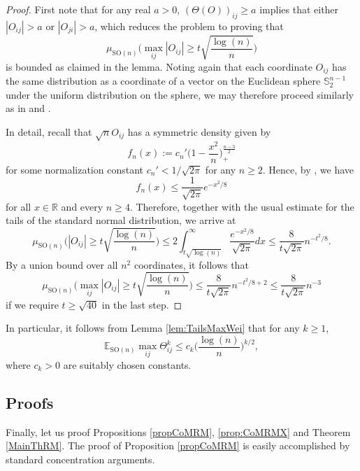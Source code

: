 \documentclass[a4paper,12pt]{amsart}
\numberwithin{equation}{section}
\theoremstyle{remark}
\def\E{{\mathbb E}}
\def\R{{\mathbb R}}
\def\S{{\mathbb S}}
\begin{document}
\begin{proof}
First note that for any real $a> 0$, $(\Theta(O))_{ij} \ge a$ implies that either $|O_{ij}| > a$ or $|O_{ji}| > a$, which reduces the problem to proving that
\[
\mu_{\mathrm{SO}(n)}\Big(\max_{ij} |O_{ij}| \ge t\sqrt{\frac{\log(n)}{n}}\Big)
\]
is bounded as claimed in the lemma. Noting again that each coordinate $O_{ij}$ has the same distribution as a coordinate of a vector on the Euclidean sphere $\S_2^{n-1}$ under the uniform distribution on the sphere, we may therefore proceed similarly as in \cite[Lem.\ 2.6]{Neu23} and \cite[Ch.\ 11.1]{BCG23}.

In detail, recall that $\sqrt{n} O_{ij}$ has a symmetric density given by
\[
f_n(x) := c_n'\Big(1-\frac{x^2}{n}\Big)_+^{\frac{n-3}{2}}
\]
for some normalization constant $c_n' < 1/\sqrt{2\pi}$ for any $n \ge 2$. Hence, by \cite[Lem.\ 11.1.1]{BCG23}, we have
\[
f_n(x) \le \frac{1}{\sqrt{2\pi}} e^{-x^2/8}
\]
for all $x \in \R$ and every $n \ge 4$. Therefore, together with the usual estimate for the tails of the standard normal distribution, we arrive at
\[
\mu_{\mathrm{SO}(n)}\Big(|O_{ij}| \ge t\sqrt{\frac{\log(n)}{n}}\Big) \le 2 \int_{t\sqrt{\log(n)}}^\infty \frac{e^{-x^2/8}}{\sqrt{2\pi}} dx \le \frac{8}{t\sqrt{2\pi}}n^{-t^2/8}.
\]
By a union bound over all $n^2$ coordinates, it follows that
\[
\mu_{\mathrm{SO}(n)}\Big(\max_{ij} |O_{ij}| \ge t\sqrt{\frac{\log(n)}{n}}\Big) \le \frac{8}{t\sqrt{2\pi}}n^{-t^2/8+2} \le \frac{8}{t\sqrt{2\pi}}n^{-3}
\]
if we require $t \ge \sqrt{40}$ in the last step.
\end{proof}

In particular, it follows from Lemma \ref{lem:TailsMaxWei} that for any $k \ge 1$,
\begin{equation}\label{eq:MomMaxTh}
    \E_{\mathrm{SO}(n)}\max_{ij} \Theta_{ij}^k \le c_k \Big(\frac{\log(n)}{n}\Big)^{k/2},
\end{equation}
where $c_k>0$ are suitably chosen constants.

\subsection{Proofs}\label{sec:PfsRM}
Finally, let us proof Propositions \ref{propCoMRM}, \ref{prop:CoMRMX} and Theorem \ref{MainThRM}. The proof of Proposition \ref{propCoMRM} is easily accomplished by standard concentration arguments.
\end{document}
